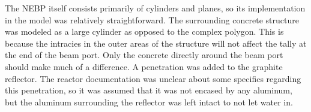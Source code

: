 The NEBP itself consists primarily of cylinders and planes, so its implementation in the model was relatively straightforward.
The surrounding concrete structure was modeled as a large cylinder as opposed to the complex polygon.
This is because the intracies in the outer areas of the structure will not affect the tally at the end of the beam port.
Only the concrete directly around the beam port should make much of a difference.
A penetration was added to the graphite reflector.
The reactor documentation was unclear about some specifics regarding this penetration, so it was assumed that it was not encased by any aluminum, but the aluminum surrounding the reflector was left intact to not let water in.




